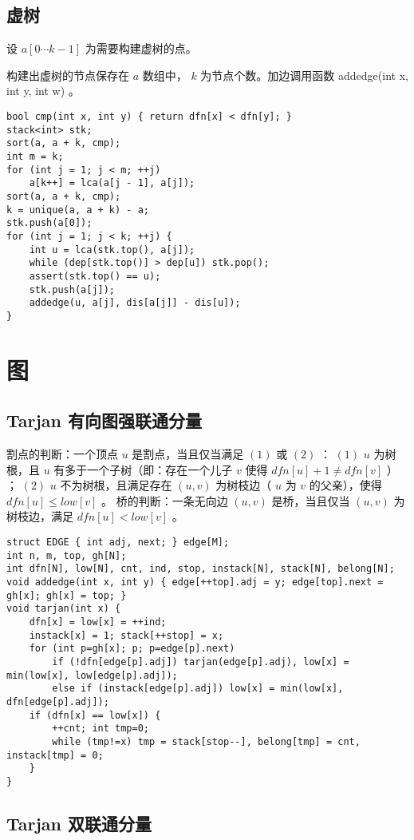 \documentclass[landscape,a4paper]{article}
\begin{document}
\subsection{虚树}

设 $a[0 \cdots k - 1]$ 为需要构建虚树的点。

构建出虚树的节点保存在 $a$ 数组中， $k$ 为节点个数。加边调用函数 addedge(int x, int y, int w) 。

\begin{lstlisting}
bool cmp(int x, int y) { return dfn[x] < dfn[y]; }
stack<int> stk;
sort(a, a + k, cmp);
int m = k;
for (int j = 1; j < m; ++j)
	a[k++] = lca(a[j - 1], a[j]);
sort(a, a + k, cmp);
k = unique(a, a + k) - a;
stk.push(a[0]);
for (int j = 1; j < k; ++j) {
	int u = lca(stk.top(), a[j]);
	while (dep[stk.top()] > dep[u]) stk.pop();
	assert(stk.top() == u);
	stk.push(a[j]);
	addedge(u, a[j], dis[a[j]] - dis[u]);
}
\end{lstlisting}

\section{图}

\subsection{Tarjan 有向图强联通分量}
 割点的判断：一个顶点 $u$ 是割点，当且仅当满足 $(1)$ 或 $(2)$ ： $(1)$ $u$ 为树根，且 $u$ 有多于一个子树（即：存在一个儿子 $v$ 使得 $dfn[u] + 1 \neq dfn[v]$ ） ； $(2)$ $u$ 不为树根，且满足存在 $(u, v)$ 为树枝边（ $u$ 为 $v$ 的父亲），使得 $dfn[u] \leq low[v]$ 。
 桥的判断：一条无向边 $(u, v)$ 是桥，当且仅当 $(u, v)$ 为树枝边，满足 $dfn[u] < low[v]$ 。
\begin{lstlisting}
struct EDGE { int adj, next; } edge[M];
int n, m, top, gh[N];
int dfn[N], low[N], cnt, ind, stop, instack[N], stack[N], belong[N];
void addedge(int x, int y) { edge[++top].adj = y; edge[top].next = gh[x]; gh[x] = top; }
void tarjan(int x) {
	dfn[x] = low[x] = ++ind;
	instack[x] = 1; stack[++stop] = x;
	for (int p=gh[x]; p; p=edge[p].next)
		if (!dfn[edge[p].adj]) tarjan(edge[p].adj), low[x] = min(low[x], low[edge[p].adj]);
		else if (instack[edge[p].adj]) low[x] = min(low[x], dfn[edge[p].adj]);
	if (dfn[x] == low[x]) {
		++cnt; int tmp=0;
		while (tmp!=x) tmp = stack[stop--], belong[tmp] = cnt, instack[tmp] = 0;
	}
}
\end{lstlisting}

\subsection{Tarjan 双联通分量}
\end{document}
